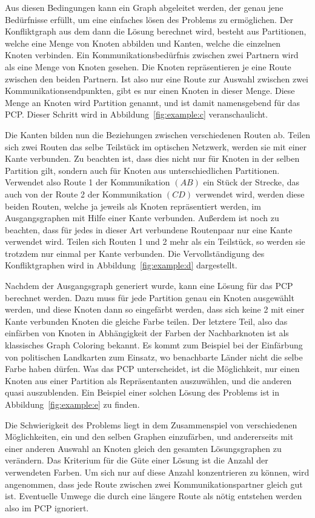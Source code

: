 Aus diesen Bedingungen kann ein Graph abgeleitet werden, der genau jene Bedürfnisse erfüllt, um eine einfaches lösen des Problems zu ermöglichen. Der Konfliktgraph
aus dem dann die Lösung berechnet wird, besteht aus Partitionen, welche eine Menge von Knoten abbilden und Kanten, welche die einzelnen Knoten verbinden.
Ein Kommunikationsbedürfnis zwischen zwei Partnern wird als eine Menge von Knoten gesehen. Die Knoten repräsentieren je eine Route zwischen den beiden Partnern. Ist also nur eine Route zur Auswahl
zwischen zwei Kommunikationsendpunkten, gibt es nur einen Knoten in dieser Menge. Diese Menge an Knoten wird Partition genannt, und ist damit namensgebend für das PCP\@. Dieser
Schritt wird in Abbildung~\ref{fig:example:c} veranschaulicht.

Die Kanten bilden nun die Beziehungen zwischen verschiedenen Routen ab. Teilen sich zwei Routen das selbe Teilstück im optischen Netzwerk, werden sie mit einer Kante verbunden.
Zu beachten ist, dass dies nicht nur für Knoten in der selben Partition gilt, sondern auch für Knoten aus unterschiedlichen Partitionen. Verwendet also Route 1 der
Kommunikation $(AB)$ ein Stück der Strecke, das auch von der Route 2 der Kommunikation $(CD)$ verwendet wird, werden diese beiden Routen, welche ja jeweils als Knoten
repräsentiert werden, im Ausgangsgraphen mit Hilfe einer Kante verbunden. Außerdem ist noch zu beachten, dass für jedes in dieser Art verbundene Routenpaar nur eine Kante
verwendet wird. Teilen sich Routen 1 und 2 mehr als ein Teilstück, so werden sie trotzdem nur einmal per Kante verbunden. Die Vervollständigung des Konfliktgraphen
wird in Abbildung~\ref{fig:example:d} dargestellt.

Nachdem der Ausgangsgraph generiert wurde, kann eine Lösung für das PCP berechnet werden. Dazu muss für jede Partition genau ein Knoten ausgewählt werden, und diese
Knoten dann so eingefärbt werden, dass sich keine 2 mit einer Kante verbunden Knoten die gleiche Farbe teilen. Der letztere Teil, also das einfärben von Knoten in
Abhängigkeit der Farben der Nachbarknoten ist als klassisches Graph Coloring bekannt. Es kommt zum Beispiel bei der Einfärbung von politischen Landkarten zum Einsatz, 
wo benachbarte Länder nicht die selbe Farbe haben dürfen. Was das PCP unterscheidet, ist die Möglichkeit, nur einen Knoten aus einer Partition als Repräsentanten
auszuwählen, und die anderen quasi auszublenden. Ein Beispiel einer solchen Lösung des Problems ist in Abbildung~\ref{fig:example:e} zu finden.

Die Schwierigkeit des Problems liegt in dem Zusammenspiel von verschiedenen Möglichkeiten, ein und den selben Graphen einzufärben, und andererseits mit einer anderen 
Auswahl an Knoten gleich den gesamten Lösungsgraphen zu verändern. Das Kriterium für die Güte einer Lösung ist die Anzahl der verwendeten Farben. Um sich nur auf diese 
Anzahl konzentrieren zu können, wird angenommen, dass jede Route zwischen zwei Kommunikationspartner gleich gut ist. Eventuelle Umwege die durch eine längere Route als nötig 
entstehen werden also im PCP ignoriert. 

